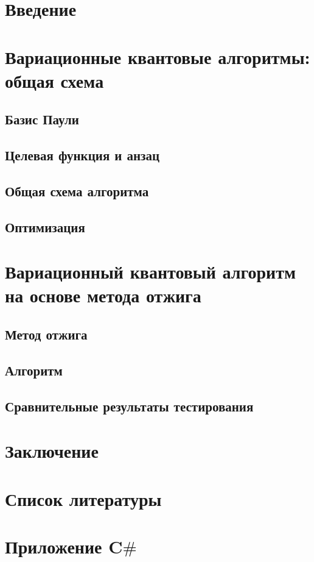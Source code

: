 \documentclass[a4paper]{report}
\begin{document}
\chapter*{Введение}

\chapter{Вариационные квантовые алгоритмы: общая схема}

\section{Базис Паули}

\section{Целевая функция и анзац}

\section{Общая схема алгоритма}

\section{Оптимизация}

\chapter{Вариационный квантовый алгоритм на основе метода отжига}

\section{Метод отжига}

\section{Алгоритм}

\section{Сравнительные результаты тестирования}

\chapter*{Заключение}

\chapter*{Список литературы}

\chapter*{Приложение {\huge C{$\#$}}}
\end{document}
